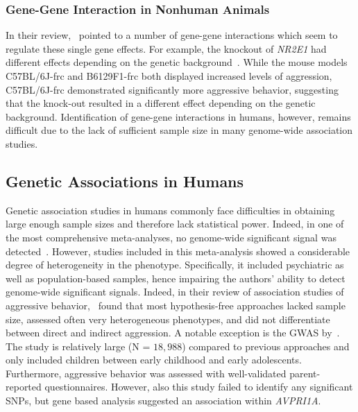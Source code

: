 \subsubsection{Gene-Gene Interaction in Nonhuman Animals}
\label{ssub:Gene-Gene_Interaction_in_nonhuman_animals}

In their review,~\citet{Anholt2012} pointed to a number of gene-gene interactions which seem to regulate these single gene effects.
For example, the knockout of \textit{NR2E1} had different effects depending on the genetic background~\cite{Young2002}.
While the mouse models C57BL/6J-frc and B6129F1-frc both displayed increased levels of aggression, C57BL/6J-frc demonstrated significantly more aggressive behavior,
 suggesting that the knock-out resulted in a different effect depending on the genetic background.
Identification of gene-gene interactions in humans, however, remains difficult due to the lack of sufficient sample size in many genome-wide association studies.

\subsection{Genetic Associations in Humans}
\label{sub:genetic_associations_in_humans}

Genetic association studies in humans commonly face difficulties in obtaining large enough sample sizes and therefore lack statistical power.
Indeed, in one of the most comprehensive meta-analyses, no genome-wide significant signal was detected~\citet{Vassos2014}.
However, studies included in this meta-analysis showed a considerable degree of heterogeneity in the phenotype.
Specifically, it included psychiatric as well as population-based samples, hence impairing the authors' ability to detect genome-wide significant signals.
Indeed, in their review of association studies of aggressive behavior,~\citet{Fernandez-Castillo2016} found that most hypothesis-free approaches lacked sample size, assessed often very heterogeneous phenotypes, and did not differentiate between direct and indirect aggression. 
A notable exception is the GWAS by~\citet{Pappa2016a}.
The study is relatively large (N = $18,988$) compared to previous approaches and only included children between early childhood and early adolescents.
Furthermore, aggressive behavior was assessed with well-validated parent-reported questionnaires. 
However, also this study failed to identify any significant SNPs, but gene based analysis suggested an association within \textit{AVPRI1A}.

